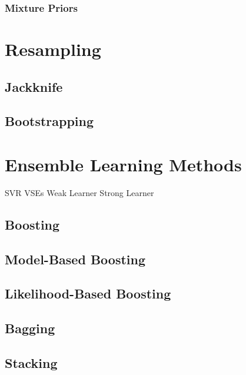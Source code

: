 \subsubsection{Mixture Priors}

\section{Resampling}
\subsection{Jackknife}
\subsection{Bootstrapping}

\section{Ensemble Learning Methods}
SVR
VSEs
Weak Learner
Strong Learner
\subsection{Boosting}
\subsection{Model-Based Boosting}
\subsection{Likelihood-Based Boosting}
\subsection{Bagging}
\subsection{Stacking}
